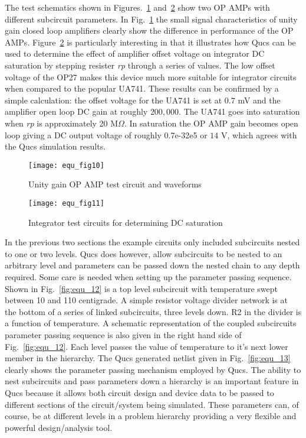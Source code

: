 The test schematics shown in Figures.~\ref{fig:equ_10}
and~\ref{fig:equ_11} show two OP AMPs with different subcircuit
parameters. In Fig.~\ref{fig:equ_10} the small signal characteristics
of unity gain closed loop amplifiers clearly show the difference in
performance of the OP AMPs.  Figure~\ref{fig:equ_11} is particularly
interesting in that it illustrates how Qucs can be used to determine
the effect of amplifier offset voltage on integrator DC saturation by
stepping resister \textit{rp} through a series of values. The low
offset voltage of the OP27 makes this device much more suitable for
integrator circuits when compared to the popular UA741. These results
can be confirmed by a simple calculation: the offset voltage for the
UA741 is set at $0.7$ mV and the amplifier open loop DC gain at
roughly $200,000$. The UA741 goes into saturation when \textit{rp} is
approximately 20 M$\Omega$. In saturation the OP AMP gain becomes open
loop giving a DC output voltage of roughly 0.7e-3\cdot 2e5 or $14$ V,
which agrees with the Qucs simulation results.


\begin{figure}[h]
  \centering
  \texttt{[image: equ\_fig10]}
  \caption{Unity gain OP AMP test circuit and waveforms} 
  \label{fig:equ_10}
\end{figure}  



\begin{figure} [h]
  \centering
  \texttt{[image: equ\_fig11]}
  \caption{Integrator test circuits for determining DC saturation}
  \label{fig:equ_11} 
\end{figure} 


In the previous two sections the example circuits only included
subcircuits nested to one or two levels. Qucs does however, allow
subcircuits to be nested to an arbitrary level and parameters can be
passed down the nested chain to any depth required. Some care is
needed when setting up the parameter passing sequence.  Shown in
Fig.~\ref{fig:equ_12} is a top level subcircuit with temperature swept
between 10 and 110 centigrade. A simple resistor voltage divider
network is at the bottom of a series of linked subcircuits, three
levels down. R2 in the divider is a function of temperature. A
schematic representation of the coupled subcircuits parameter passing
sequence is also given in the right hand side of
Fig.~\ref{fig:equ_12}. Each level passes the value of temperature to
it's next lower member in the hierarchy.  The Qucs generated netlist
given in Fig.~\ref{fig:equ_13} clearly shows the parameter passing
mechanism employed by Qucs.  The ability to nest subcircuits and pass
parameters down a hierarchy is an important feature in Qucs because it
allows both circuit design and device data to be passed to different
sections of the circuit/system being simulated.  These parameters can,
of course, be at different levels in a problem hierarchy providing a
very flexible and powerful design/analysis tool.


